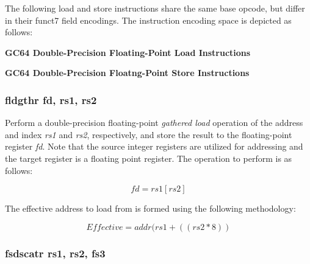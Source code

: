 \documentclass{article}
\begin{document}
The following load and store instructions share the same base
opcode, but differ in their funct7 field encodings.  The instruction
encoding space is depicted as follows:


\begin{center}
\textbf{GC64 Double-Precision Floating-Point Load Instructions}
\makebox[0.03in][s]{}\makebox[0.03in][s]{}\makebox[0.03in][s]{}\makebox[0.03in][s]{}\makebox[0.03in][s]{}
\end{center}

\begin{center}
\textbf{GC64 Double-Precision Floatng-Point Store Instructions}
\makebox[0.03in][s]{}\makebox[0.03in][s]{}\makebox[0.03in][s]{}\makebox[0.03in][s]{}\makebox[0.03in][s]{}
\end{center}


\subsubsection{fldgthr fd, rs1, rs2}

Perform a double-precision floating-point \emph{gathered load} operation of the
address and index \emph{rs1} and \emph{rs2}, respectively, and store the result
to the floating-point register \emph{fd}.  Note that the source integer registers are
utilized for addressing and the target register is a floating point register.
The operation to perform is as follows:

\begin{equation}
fd = rs1[rs2]
\end{equation}

The effective address to load
from is formed using the following methodology:

\begin{equation}
Effective = addr(rs1 + ((rs2 * 8))
\end{equation}


\subsubsection{fsdscatr rs1, rs2, fs3}
\end{document}
